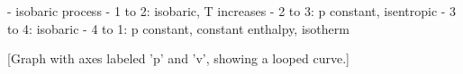 - isobaric process
- 1 to 2: isobaric, T increases
- 2 to 3: p constant, isentropic
- 3 to 4: isobaric
- 4 to 1: p constant, constant enthalpy, isotherm

[Graph with axes labeled 'p' and 'v', showing a looped curve.]